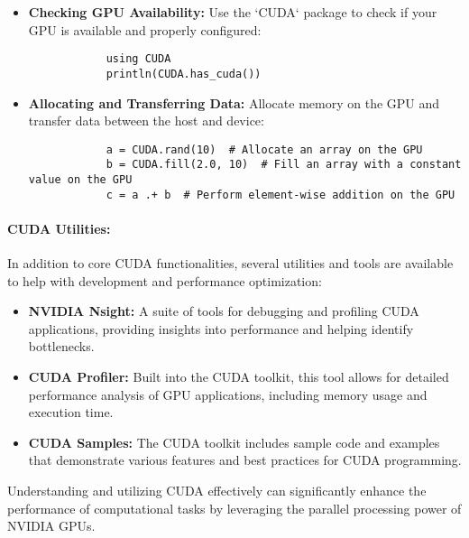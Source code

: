     \begin{itemize}
        \item \textbf{Checking GPU Availability:} Use the `CUDA` package to check if your GPU is available and properly configured:
        \begin{verbatim}
            using CUDA
            println(CUDA.has_cuda())
        \end{verbatim}
        \item \textbf{Allocating and Transferring Data:} Allocate memory on the GPU and transfer data between the host and device:
        \begin{verbatim}
            a = CUDA.rand(10)  # Allocate an array on the GPU
            b = CUDA.fill(2.0, 10)  # Fill an array with a constant value on the GPU
            c = a .+ b  # Perform element-wise addition on the GPU
        \end{verbatim}
    \end{itemize}

    \paragraph{CUDA Utilities:} In addition to core CUDA functionalities, several utilities and tools are available to help with development and performance optimization:
    \begin{itemize}
        \item \textbf{NVIDIA Nsight:} A suite of tools for debugging and profiling CUDA applications, providing insights into performance and helping identify bottlenecks.
        \item \textbf{CUDA Profiler:} Built into the CUDA toolkit, this tool allows for detailed performance analysis of GPU applications, including memory usage and execution time.
        \item \textbf{CUDA Samples:} The CUDA toolkit includes sample code and examples that demonstrate various features and best practices for CUDA programming.
    \end{itemize}

    Understanding and utilizing CUDA effectively can significantly enhance the performance of computational tasks by leveraging the parallel processing power of NVIDIA GPUs.
